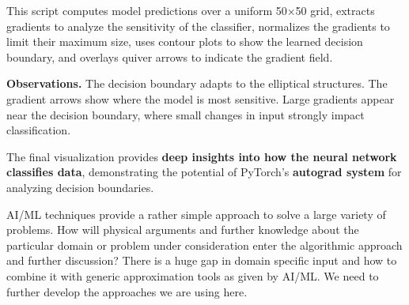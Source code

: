 This script computes model predictions over a uniform 50×50 grid, extracts gradients to analyze the sensitivity of the classifier, normalizes the gradients to limit their maximum size, uses contour plots to show the learned decision boundary, and overlays quiver arrows to indicate the gradient field.

\textbf{Observations.} The decision boundary adapts to the elliptical structures. The gradient arrows show where the model is most sensitive. Large gradients appear near the decision boundary, where small changes in input strongly impact classification.

The final visualization provides \textbf{deep insights into how the neural network classifies data}, demonstrating the potential of PyTorch's \textbf{autograd system} for analyzing decision boundaries.

\begin{recommendationbox}
AI/ML techniques provide a rather simple approach to solve a large variety of problems. How will physical arguments and further knowledge about the particular domain or problem under consideration enter the algorithmic approach and further discussion? There is a huge gap in domain specific input and how to combine it with generic approximation tools as given by AI/ML. We need to further develop the approaches we are using here.
\end{recommendationbox}
